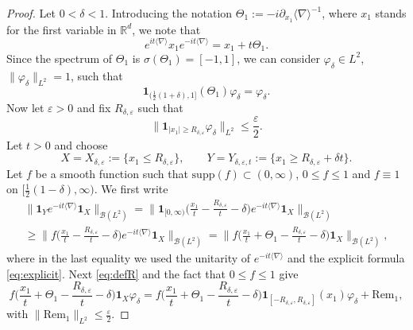 \documentclass[12pt]{article}
\newcommand{\jnabla}{{\langle\nabla\rangle}}
\theoremstyle{plain}
\begin{document}
\begin{proof}
   Let $0<\delta<1$. Introducing the notation $\Theta_1:=-i\partial_{x_1}\langle\nabla\rangle^{-1}$, where $x_1$ stands for the first variable in $\mathbb{R}^d$, we note that
   \begin{equation}\label{eq:explicit}
       e^{it\jnabla}x_1e^{-it\jnabla}=x_1+t\Theta_1.
   \end{equation}
   Since the spectrum of $\Theta_1$ is $\sigma(\Theta_1)=[-1,1]$, we can consider $\varphi_\delta\in L^2$, $\|\varphi_\delta\|_{L^2}=1$, such that 
    \begin{equation}\label{eq:def_varphi}
        \mathbf{1}_{(\frac12(1+\delta),1]}(\Theta_1)\varphi_\delta=\varphi_\delta.
    \end{equation}
Now let $\varepsilon>0$ and fix $R_{\delta,\varepsilon}$ such that
    \begin{equation}\label{eq:defR}
        \|\mathbf{1}_{|x_1|\ge R_{\delta,\varepsilon}}\varphi_\delta\|_{L^2}\le\frac\varepsilon2.
    \end{equation}
Let $t>0$ and choose
    \begin{equation*}
        X=X_{\delta,\varepsilon}:=\{x_1\le R_{\delta,\varepsilon}\}, \qquad Y=Y_{\delta,\varepsilon,t}:=\{x_1\ge R_{\delta,\varepsilon}+\delta t\}.
    \end{equation*}
    Let $f$ be a smooth function such that $\mathrm{supp}(f)\subset(0,\infty)$, $0\le f\le 1$ and $f\equiv1$ on $[\frac12(1-\delta),\infty)$. We first write
    \begin{multline}
       \big\|\mathbf{1}_Y e^{-it\langle\nabla\rangle}\mathbf{1}_X\big\|_{\mathcal{B}(L^2)} =\Big\|\mathbf{1}_{[0,\infty)}\Big(\frac{x_1}{t}-\frac{R_{\delta,\varepsilon}}{t}-\delta\Big) e^{-it\langle\nabla\rangle}\mathbf{1}_X\Big\|_{\mathcal{B}(L^2)}\\
        \ge\Big\|f\Big(\frac{x_1}{t}-\frac{R_{\delta,\varepsilon}}{t}-\delta\Big) e^{-it\langle\nabla\rangle}\mathbf{1}_X\Big\|_{\mathcal{B}(L^2)}
        =\Big\|f\Big(\frac{x_1}{t}+\Theta_1-\frac{R_{\delta,\varepsilon}}{t}-\delta\Big) \mathbf{1}_X\Big\|_{\mathcal{B}(L^2)}, \label{eq:last_proof}
    \end{multline}
    where in the last equality we used the unitarity of $e^{-it\langle\nabla\rangle}$ and the explicit formula \eqref{eq:explicit}. 
    Next \eqref{eq:defR} and the fact that $0\le f\le1$ give
    \begin{equation*}
        f\Big(\frac{x_1}{t}+\Theta_1-\frac{R_{\delta,\varepsilon}}{t}-\delta\Big) \mathbf{1}_X\varphi_\delta=f\Big(\frac{x_1}{t}+\Theta_1-\frac{R_{\delta,\varepsilon}}{t}-\delta\Big) \mathbf{1}_{[-R_{\delta,\varepsilon},R_{\delta,\varepsilon}]}(x_1)\varphi_\delta+\mathrm{Rem}_1,
    \end{equation*}
    with $\|\mathrm{Rem}_1\|_{L^2}\le\frac\varepsilon2$. 
    

\end{proof}
\end{document}
